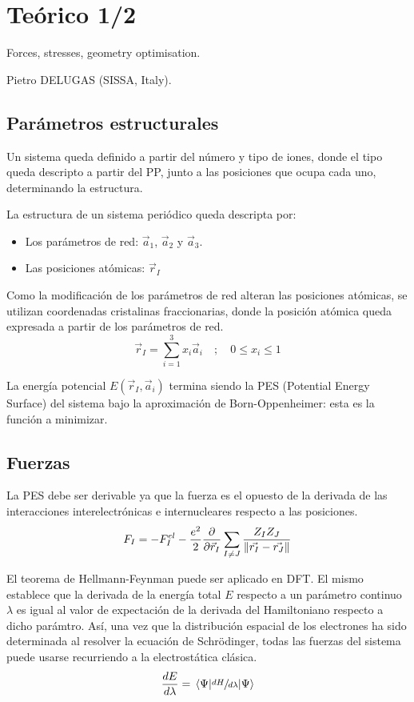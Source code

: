 \section{Teórico 1/2}

   Forces, stresses, geometry optimisation.

  	Pietro DELUGAS (SISSA, Italy).

\subsection{Parámetros estructurales}

  Un sistema queda definido a partir del número y tipo de iones, donde el tipo queda descripto a partir del PP, junto a las posiciones que ocupa cada uno, determinando la estructura.

  La estructura de un sistema periódico queda descripta por:
    \begin{itemize}
      \item Los parámetros de red: $\vec{a}_1$, $\vec{a}_2$ y $\vec{a}_3$.
      \item Las posiciones atómicas: $\vec{r}_I$
    \end{itemize}

  Como la modificación de los parámetros de red alteran las posiciones atómicas, se utilizan coordenadas cristalinas fraccionarias, donde la posición atómica queda expresada a partir de los parámetros de red.
    $$\vec{r}_I = \sum_{i=1}^3 x_i \vec{a}_i \quad ; \quad 0 \leq x_i \leq 1$$

  La energía potencial $E(\vec{r}_I, \vec{a}_i)$ termina siendo la PES (Potential Energy Surface) del sistema bajo la aproximación de Born-Oppenheimer: esta es la función a minimizar.

\subsection{Fuerzas}

  La PES debe ser derivable ya que la fuerza es el opuesto de la derivada de las interacciones interelectrónicas e internucleares respecto a las posiciones.
    $$F_I = - F_I^{el} - \frac{e^2}{2} \frac{\partial}{\partial \vec{r}_I} \sum_{I\neq J} \frac{Z_I Z_J}{\norm{\vec{r_I} - \vec{r_J}}}$$

  El teorema de Hellmann-Feynman puede ser aplicado en DFT. El mismo establece que la derivada de la energía total $E$ respecto a un parámetro continuo $\lambda$ es igual al valor de expectación de la derivada del Hamiltoniano respecto a dicho parámtro. Así, una vez que la distribución espacial de los electrones ha sido determinada al resolver la ecuación de Schrödinger, todas las fuerzas del sistema puede usarse recurriendo a la electrostática clásica.
    $$\frac{d E}{d \lambda} = \expval{\sfrac{d H}{d \lambda}}{\Psi}$$

